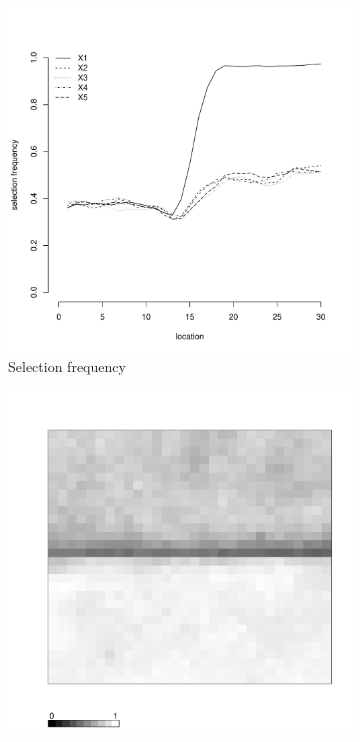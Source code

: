 \documentclass[authoryear, review, 11pt]{elsarticle}
\begin{document}
\begin{figure}
\begin{subfigure}[b]{0.45\textwidth}
		\includegraphics[width=\textwidth]{../../figures/simulation/15.9.profile_selection.pdf}
		\caption{Selection frequency}
	\end{subfigure}
	\begin{subfigure}[b]{0.45\textwidth}
	\centering
		\includegraphics[width=\textwidth]{../../figures/simulation/X1.15.9.unshrunk_bootstrap_coverage.pdf}

\end{subfigure}
\end{figure}
\end{document}
